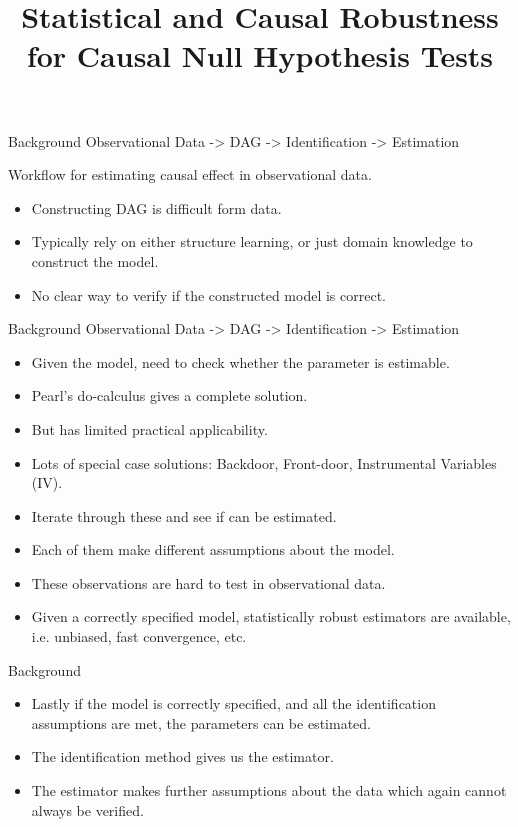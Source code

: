 \documentclass{beamer}
\begin{document}
\title[]{Statistical and Causal Robustness for Causal Null Hypothesis Tests}
\date{}

\maketitle

\begin{frame}{Background}
	Observational Data -> DAG -> Identification -> Estimation


	Workflow for estimating causal effect in observational data.

	\begin{itemize}
		\item Constructing DAG is difficult form data.
		\item Typically rely on either structure learning, or just domain knowledge to construct the model.
		\item No clear way to verify if the constructed model is correct.
	\end{itemize}	
\end{frame}

\begin{frame}{Background}
	Observational Data -> DAG -> Identification -> Estimation
	
	\begin{itemize}
		\item Given the model, need to check whether the parameter is estimable.
		\item Pearl's do-calculus gives a complete solution.
		\item But has limited practical applicability.
		\item Lots of special case solutions: Backdoor, Front-door, Instrumental Variables (IV).
		\item Iterate through these and see if can be estimated.
		\item Each of them make different assumptions about the model.
		\item These observations are hard to test in observational data.
		\item Given a correctly specified model, statistically robust estimators are available, i.e. unbiased, fast convergence, etc.
	\end{itemize}
\end{frame}

\begin{frame}{Background}
	\begin{itemize}
		\item Lastly if the model is correctly specified, and all the identification assumptions are met, the parameters can be estimated.
		\item The identification method gives us the estimator.
		\item The estimator makes further assumptions about the data which again cannot always be verified.
	\end{itemize}
\end{frame}
\end{document}

